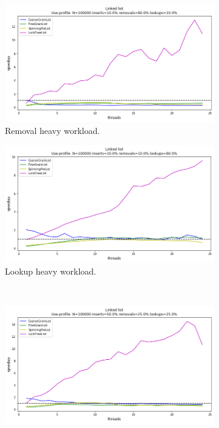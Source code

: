 \documentclass[11pt]{article}
\begin{document}
\begin{figure}[h]
\begin{subfigure}{0.5\textwidth}
  \centering
  \includegraphics[width=1\linewidth]{figs/lateday/combined/lateday_combined_list_insert_10_lookup_10_removal_80}
  \caption{Removal heavy workload.}
  \label{fig:listRemovalHeavy}
\end{subfigure}%
\hspace*{\fill}
\begin{subfigure}{.5\textwidth}
  \centering
  \includegraphics[width=1\linewidth]{figs/lateday/combined/lateday_combined_list_insert_10_lookup_80_removal_10}
  \caption{Lookup heavy workload.}
  \label{fig:listLookupHeavy}
\end{subfigure}
\\ %
\begin{subfigure}{.5\textwidth}
  \centering
  \includegraphics[width=1\linewidth]{figs/lateday/combined/lateday_combined_list_insert_50_lookup_25_removal_25}

\end{subfigure}
\end{figure}
\end{document}
